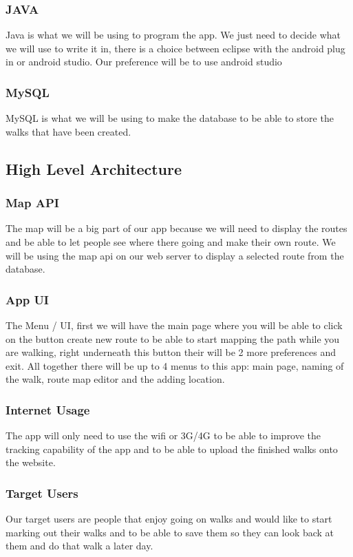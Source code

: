 \documentclass{project}
\begin{document}
\subsubsection{JAVA}
Java is what we will be using to program the app. We just need to
decide what we will use to write it in, there is a choice between
eclipse with the android plug in or android studio. Our preference will be to use android studio

\subsubsection{MySQL}
MySQL is what we will be using to make the database to be able 
to store the walks that have been created. 

\subsection{High Level Architecture}
\subsubsection{Map API}
The map will be a big part of our app because we will need to display the
routes and be able to let people see where there going and make their own
route. We will be using the map api on our web server to display a selected route from the database.

\subsubsection{App UI}
The Menu / UI, first we will have the main page where you will 
be able to click on the button create new route to be able to start mapping 
the path while you are walking, right underneath this button their will be 
2 more preferences and exit. All together there will be up to 4 menus to 
this app: main page, naming of the walk, route map editor and the adding location. 

\subsubsection{Internet Usage}
The app will only need to use the wifi or 3G/4G to be able to improve 
the tracking capability of the app and to be able to upload the finished walks onto the website.

\subsubsection{Target Users}
Our target users are people that enjoy going on walks and would like to start marking 
out their walks and to be able to save them so they can look back at them and do that walk a later day. 
\end{document}
